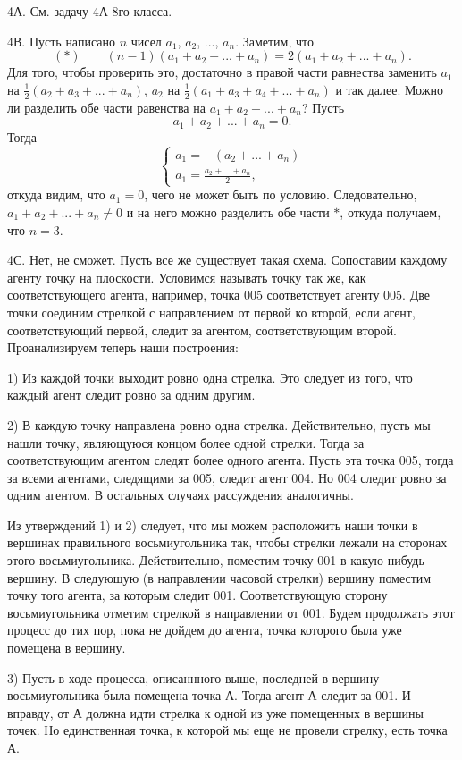 \documentclass[12pt]{amsart}
\theoremstyle{definition}
\theoremstyle{remark}
\theoremstyle{plain}
\begin{document}
4А. См. задачу 4А 8го класса.

4В. Пусть написано $n$ чисел $a_1$, $a_2$, ..., $a_n$. Заметим, что
$$
(*)\qquad (n-1)(a_1+a_2+...+a_n)=2(a_1+a_2+...+a_n).
$$
Для того, чтобы проверить это, достаточно в правой части равнества заменить $a_1$ на $\frac{1}{2}(a_2+a_3+...+a_n)$, $a_2$ на $\frac{1}{2}(a_1+a_3+a_4+...+a_n)$ и так далее. Можно ли разделить обе части равенства на $a_1+a_2+...+a_n$? Пусть
$$
a_1+a_2+...+a_n=0.
$$
Тогда
$$
\begin{cases}
a_1=-(a_2+...+a_n)\\
a_1=\frac{a_2+...+a_n}{2},
\end{cases}$$
откуда видим, что $a_1=0$, чего не может быть по условию. Следовательно, $a_1+a_2+...+a_n\neq 0$ и на него можно разделить обе части $*$, откуда получаем, что $n=3$.

4С. Нет, не сможет. Пусть все же существует такая схема. Сопоставим каждому агенту точку на плоскости. Условимся называть точку так же, как соответствующего агента, например, точка 005 соответствует агенту 005. Две точки соединим стрелкой с направлением от первой ко второй, если агент, соответствующий первой, следит за агентом, соответствующим второй. Проанализируем теперь наши построения:

1) Из каждой точки выходит ровно одна стрелка. Это следует из того, что каждый агент следит ровно за одним другим.

2) В каждую точку направлена ровно одна стрелка. Действительно, пусть мы нашли точку, являющуюся концом более одной стрелки. Тогда за соответствующим агентом следят более одного агента. Пусть эта точка 005, тогда за всеми агентами, следящими за 005, следит агент 004. Но 004 следит ровно за одним агентом. В остальных случаях рассуждения аналогичны.

Из утверждений 1) и 2) следует, что мы можем расположить наши точки в вершинах правильного восьмиугольника так, чтобы стрелки лежали на сторонах этого восьмиугольника. Действительно, поместим точку 001 в какую-нибудь вершину. В следующую (в направлении часовой стрелки) вершину поместим точку того агента, за которым следит 001. Соответствующую сторону восьмиугольника отметим стрелкой в направлении от 001. Будем продолжать этот процесс до тих пор, пока не дойдем до агента, точка которого была уже помещена в вершину.

3) Пусть в ходе процесса, описаннного выше, последней в вершину восьмиугольника была помещена точка А. Тогда агент А следит за 001. И вправду, от А должна идти стрелка к одной из уже помещенных в вершины точек. Но единственная точка, к которой мы еще не провели стрелку, есть точка А.
\end{document}
